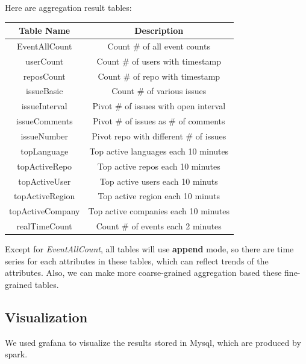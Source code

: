 Here are aggregation result tables:
\begin{table}[H]
    \centering
    \begin{tabular}{|c|c|}
    \hline
    Table Name       & Description                                     \\ \hline
    EventAllCount    & Count \# of all event counts                    \\ 
    userCount        & Count \# of users with timestamp                \\ 
    reposCount       & Count \# of repo with timestamp                 \\ 
    issueBasic       & Count \# of various issues                      \\ 
    issueInterval    & Pivot \# of issues with open interval \\ 
    issueComments    & Pivot \# of issues as \# of comments            \\ 
    issueNumber      & Pivot repo with different \# of issues          \\ 
    topLanguage      & Top active languages each 10 minutes            \\
    topActiveRepo    & Top active repos each 10 minutes                \\ 
    topActiveUser    & Top active users each  10 minuts                \\ 
    topActiveRegion  & Top active region each  10 minuts               \\ 
    topActiveCompany & Top active companies each 10 minutes            \\ 
    realTimeCount    & Count \# of events each 2 minutes              \\
    \hline
    \end{tabular}
\end{table}


Except for \textit{EventAllCount}, all tables will use \textbf{append} mode, so there are time series for each attributes in these tables, which can reflect trends of the attributes. Also, we can make more coarse-grained aggregation based these fine-grained tables.





\subsection{Visualization}
We used grafana to visualize the results stored in Mysql, which are produced by spark. 


